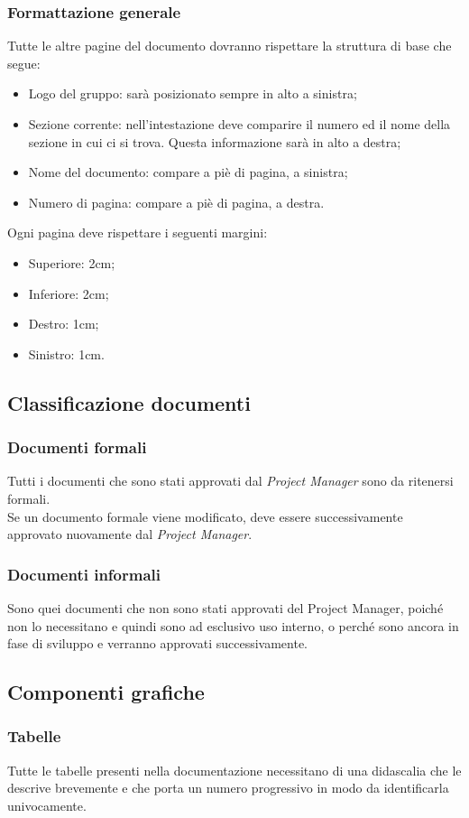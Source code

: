 \documentclass[12pt,a4paper,titlepage]{article}
\begin{document}
\subsubsection{Formattazione generale}
Tutte le altre pagine del documento dovranno rispettare la struttura di base che segue:
\begin{itemize}
	\item Logo del gruppo: sarà posizionato sempre in alto a sinistra;
	\item Sezione corrente: nell'intestazione deve comparire il numero ed il nome della sezione in cui ci si trova. Questa informazione sarà in alto a destra;
	\item Nome del documento: compare a piè di pagina, a sinistra;
	\item Numero di pagina: compare a piè di pagina, a destra.
\end{itemize} 
Ogni pagina deve rispettare i seguenti margini: 
\begin{itemize}
	\item Superiore: 2cm;
	\item Inferiore: 2cm;
	\item Destro: 1cm;
	\item Sinistro: 1cm.
\end{itemize}
\subsection{Classificazione documenti}
\subsubsection{Documenti formali}
Tutti i documenti che sono stati approvati dal \textit{Project Manager} sono da ritenersi formali.\\ 
Se un documento formale viene modificato, deve essere successivamente approvato nuovamente
dal \textit{Project Manager}. 
\subsubsection{Documenti informali}
Sono quei documenti che non sono stati approvati del Project Manager, poiché non lo necessitano e quindi sono ad esclusivo uso interno, o perché sono ancora in fase di sviluppo e verranno 
approvati successivamente.
\subsection{Componenti grafiche}
\subsubsection{Tabelle}
Tutte le tabelle presenti nella documentazione necessitano di una didascalia che le descrive brevemente e che porta un numero progressivo in modo da identificarla univocamente.
\end{document}

